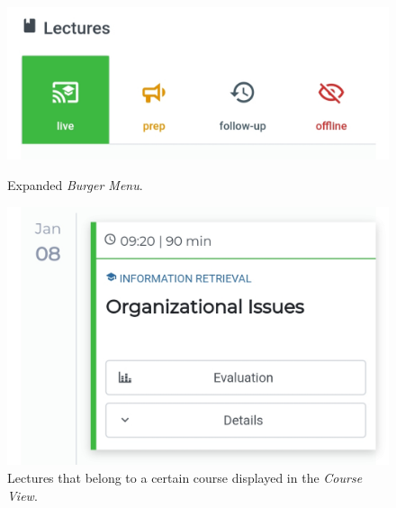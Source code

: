 \begin{figure}
	\centering
	\begin{minipage}[t]{.5\textwidth}
		\centering
		\includegraphics[width=0.95\linewidth]{screenshots/redesign/lecture_tab_labels.jpg}
		\captionsetup{width=.8\linewidth}
		\caption{Expanded \emph{Burger Menu}.}
		\label{fig:main_view_tab_labels}
	\end{minipage}%
	\begin{minipage}[t]{.5\textwidth}
		\centering
		\includegraphics[width=0.95\linewidth]{screenshots/redesign/main_view_it3_lecture_box.jpg}
		\captionsetup{width=.8\linewidth}
		\caption{Lectures that belong to a certain course displayed in the \emph{Course View}.}
		\label{fig:main_view_lecture_box_buttons}
	\end{minipage}
\end{figure}
